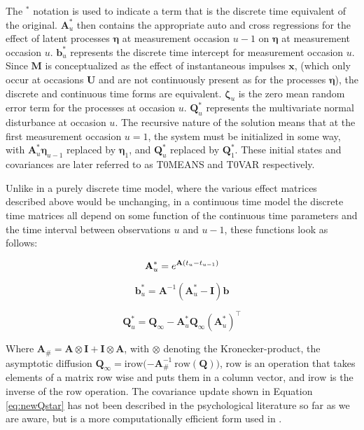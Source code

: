 \documentclass[nojss]{jss}\usepackage[]{graphicx}\usepackage[]{color}
\newcommand{\vect}[1]{\boldsymbol{\mathbf{#1}}}
\begin{document}
The $^*$ notation is used to indicate a term that is the discrete time equivalent of the original. $\vect{A}^*_u$ then contains the appropriate auto and cross regressions for the effect of latent processes $\vect{\eta}$ at measurement occasion $u-1$ on $\vect{\eta}$ at measurement occasion $u$. $\vect{b}^*_u$ represents the discrete time intercept for measurement occasion $u$. Since $\vect{M}$ is conceptualized as the effect of instantaneous impulses $\vect{x}$, (which only occur at occasions $\vect{U}$ and are not continuously present as for the processes $\vect{\eta}$), the discrete and continuous time forms are equivalent. $\vect{\zeta}_u$ is the zero mean random error term for the processes at occasion $u$. $\vect{Q}^*_u$ represents the multivariate normal disturbance at occasion $u$. The recursive nature of the solution means that at the first measurement occasion $u = 1$, the system must be initialized in some way, with $\vect{A}^*_u \vect{\eta}_{u-1}$ replaced by $\vect{\eta}_{1}$, and $\vect{Q}^*_u$ replaced by $\vect{Q}^*_{1}$. These initial states and covariances are later referred to as T0MEANS and T0VAR respectively.

Unlike in a purely discrete time model, where the various effect matrices described above would be unchanging, in a continuous time model the discrete time matrices all depend on some function of the continuous time parameters and the time interval between observations $u$ and $u-1$, these functions look as follows:

\begin{equation}
	\vect{A}^*_u = \mathnormal{e}^{\vect{A} (t_u - t_{u-1} )}  
\end{equation}

\begin{equation}
	\vect{b}^*_u = \vect{A}^{-1} (\vect{A}^*_u - \vect{I})\vect{b}  
\end{equation}

\begin{equation}
\label{eq:newQstar}
\vect{Q}^*_u = \vect{Q}_{\infty} - \vect{A}^*_u \vect{Q}_{\infty} (\vect{A}^*_u)^\top
\end{equation}

Where $\vect{A}_{\#} = \vect{A} \otimes \vect{I} + \vect{I} \otimes \vect{A} $, with $\otimes$ denoting the Kronecker-product, the asymptotic diffusion $\vect{Q}_{\infty} = \text{irow} \big( \vect{-A}_{\#}^{-1} \: \text{row} (\vect{Q}) \big)$, $\text{row}$ is an operation that takes elements of a matrix row wise and puts them in a column vector, and $\text{irow}$ is the inverse of the $\text{row}$ operation. The covariance update shown in Equation \ref{eq:newQstar} has not been described in the psychological literature so far as we are aware, but is a more computationally efficient form used in \citet{tomasson2013computational}.
\end{document}
